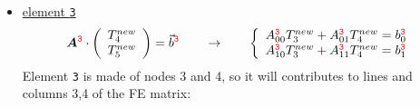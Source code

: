 \begin{itemize}
\item \underline{element {\color{red}\tt 3}} 
\[
{\bm A}^{\color{red} \tt 3}  \cdot 
\left(
\begin{array}{c}
T_4^{new} \\ T_5^{new}
\end{array}
\right)
 =  {\vec b}^{\color{red} \tt 3}
\qquad
\rightarrow
\qquad
\left\{ 
\begin{array}{l}
A_{00}^{{\color{red}\tt 3}} T_3^{new} + A_{01}^{{\color{red}\tt 3}} T_4^{new} = b^{{\color{red}\tt 3}}_0 \\
A_{10}^{{\color{red}\tt 3}} T_3^{new} + A_{11}^{{\color{red}\tt 3}} T_4^{new} = b^{{\color{red}\tt 3}}_1
\end{array}
\right.
\]
Element {\color{red}\tt 3} is made of nodes 3 and 4, so it will contributes to lines and columns 3,4 of the FE matrix:
\end{itemize}






